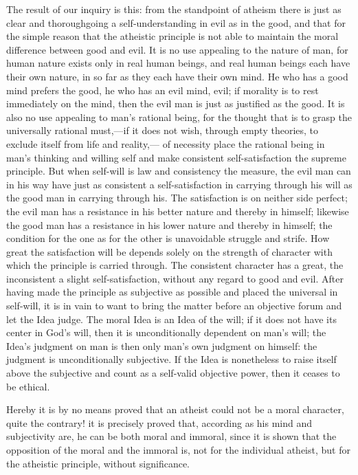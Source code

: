 \documentclass[12pt,a4paper,openany]{book}
\newcommand{\opage}[1]{\marginnote{\footnotesize\textit{[#1]}}}
\begin{document}
The result of our inquiry is this: from the standpoint of atheism
there is just as clear and thoroughgoing a
self-understanding in evil as in the good, and
\setcounter{footnote}{0}%
\opage{551}that for the simple reason that the atheistic principle is not able
to maintain the moral difference between
good and evil. It is no use appealing to
the nature of man, for human nature exists only in real
human beings, and real human beings each have their own
nature, in so far as they each have their own mind. He who has
a good mind prefers the good, he who has an evil
mind, evil; if morality is to rest immediately
on the mind, then the evil man is just as justified as the
good. It is also no use appealing to man's
rational being, for the thought that is to grasp the
universally rational must,---if it does not wish, through empty
theories, to exclude itself from life and reality,---
of necessity place the rational being in man's
thinking and willing self and make consistent
self-satisfaction the supreme principle. But when
self-will is law and consistency the measure, the
evil man can in his way have just as consistent a self-satisfaction
in carrying through his will as the good man in
carrying through his. The satisfaction is on neither side
perfect; the evil man has a resistance in his better nature
and thereby in himself; likewise the good man has a resistance in his
lower nature and thereby in himself; the condition for the one as
for the other is unavoidable struggle and strife. How great the satisfaction
will be depends solely on the strength of character
with which the principle is carried through. The consistent character
has a great, the inconsistent a slight self-satisfaction, without any regard to good and evil. After
having made the principle as subjective as possible and placed
the universal in self-will, it is in vain to want to bring
the matter before an objective forum and let the Idea judge.
\setcounter{footnote}{0}%
\opage{552}The moral Idea is an Idea of the will; if it does not have its center
in God's will, then it is unconditionally dependent on
man's will; the Idea's judgment on man is then
only man's own judgment on himself: the judgment is
unconditionally subjective. If the Idea is nonetheless to raise
itself above the subjective and count as a self-valid objective
power, then it ceases to be ethical.

Hereby it is by no means proved that an atheist
could not be a moral character, quite the contrary! it
is precisely proved that, according as his mind and subjectivity
are, he can be both moral and immoral, since it
is shown that the opposition of the moral and the immoral is, not
for the individual atheist, but for the atheistic principle,
without significance.
\end{document}

